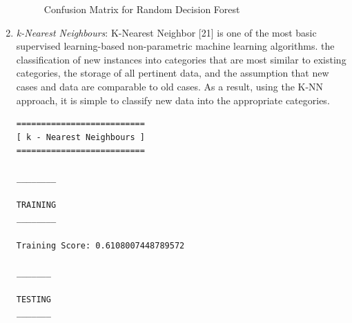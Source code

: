 \documentclass[conference]{IEEEtran}
\begin{document}
\begin{enumerate}
\begin{figure}[htbp]
\label{fig4}
\caption{Confusion Matrix for Random Decision Forest}
\end{figure}
\item \textit{k-Nearest Neighbours}: K-Nearest Neighbor [21] is one of the most basic supervised learning-based non-parametric machine learning algorithms. the classification of new instances into categories that are most similar to existing categories, the storage of all pertinent data, and the assumption that new cases and data are comparable to old cases. As a result, using the K-NN approach, it is simple to classify new data into the appropriate categories.
\begin{verbatim}
==========================
[ k - Nearest Neighbours ]
==========================

________

TRAINING
________

Training Score: 0.6108007448789572

_______

TESTING
_______


\end{verbatim}
\end{enumerate}
\end{document}

